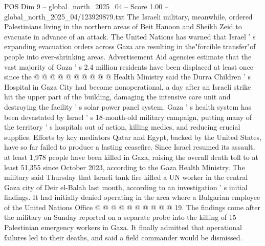 \begin{textsample}{POS Dim 9 – global\_north\_2025\_04 – Score 1.00 – global\_north\_2025\_04/123929879.txt}
The Israeli military, meanwhile, ordered Palestinians living in the northern areas of Beit Hanoon and Sheikh Zeid to evacuate in advance of an attack.
The United Nations has warned that Israel ' s expanding evacuation orders across Gaza are resulting in the"forcible transfer"of people into ever-shrinking areas.
Advertisement Aid agencies estimate that the vast majority of Gaza ' s 2.4 million residents have been displaced at least once since the @ @ @ @ @ @ @ @ @ @ Health Ministry said the Durra Children ' s Hospital in Gaza City had become nonoperational, a day after an Israeli strike hit the upper part of the building, damaging the intensive care unit and destroying the facility ' s solar power panel system.
Gaza ' s health system has been devastated by Israel ' s 18-month-old military campaign, putting many of the territory ' s hospitals out of action, killing medics, and reducing crucial supplies.
Efforts by key mediators Qatar and Egypt, backed by the United States, have so far failed to produce a lasting ceasefire.
Since Israel resumed its assault, at least 1,978 people have been killed in Gaza, raising the overall death toll to at least 51,355 since October 2023, according to the Gaza Health Ministry.
The military said Thursday that Israeli tank fire killed a UN worker in the central Gaza city of Deir el-Balah last month, according to an investigation ' s initial findings.
It had initially denied operating in the area where a Bulgarian employee of the United Nations Office @ @ @ @ @ @ @ @ @ @ 19.
The findings come after the military on Sunday reported on a separate probe into the killing of 15 Palestinian emergency workers in Gaza.
It finally admitted that operational failures led to their deaths, and said a field commander would be dismissed.

\end{textsample}
